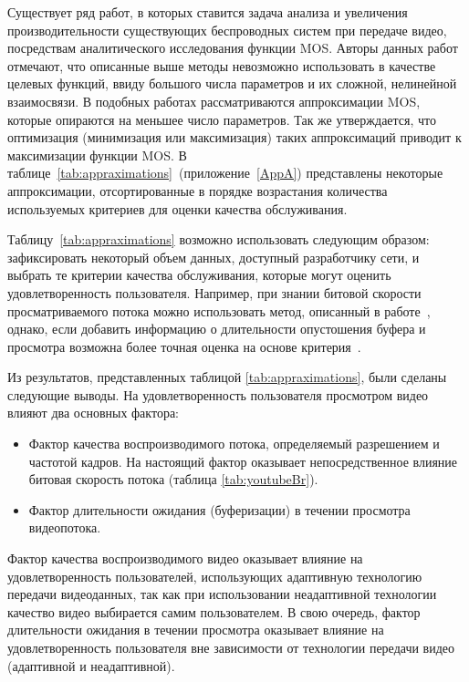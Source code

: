 Существует ряд работ, в которых ставится задача анализа и увеличения производительности существующих беспроводных систем при передаче видео, посредствам аналитического исследования функции MOS. Авторы данных работ отмечают, что описанные выше методы невозможно использовать в качестве целевых функций, ввиду большого числа параметров и их сложной, нелинейной взаимосвязи. В подобных работах рассматриваются аппроксимации MOS, которые опираются на меньшее число параметров. Так же утверждается, что оптимизация (минимизация или максимизация) таких аппроксимаций приводит к максимизации функции MOS. В таблице~\ref{tab:appraximations}~(приложение~\ref{AppA}) представлены некоторые аппроксимации, отсортированные в порядке возрастания количества используемых критериев для оценки качества обслуживания.

Таблицу~\ref{tab:appraximations} возможно использовать следующим образом: зафиксировать некоторый объем данных, доступный разработчику сети, и выбрать те критерии качества обслуживания, которые могут оценить удовлетворенность пользователя. Например, при знании битовой скорости просматриваемого потока можно использовать метод, описанный в работе~\cite{Suai2015}, однако, если добавить информацию о длительности опустошения буфера и просмотра возможна более точная оценка на основе критерия~\cite{Essaili_Rate}.

Из результатов, представленных таблицой \ref{tab:appraximations}, были сделаны следующие выводы. На удовлетворенность пользователя просмотром видео влияют два основных фактора:
\begin{itemize}
	\item Фактор качества воспроизводимого потока, определяемый разрешением и частотой кадров. На настоящий фактор оказывает непосредственное влияние битовая скорость потока (таблица \ref{tab:youtubeBr}).
	\item Фактор длительности ожидания (буферизации) в течении просмотра видеопотока.
\end{itemize}
Фактор качества воспроизводимого видео оказывает влияние на удовлетворенность пользователей, использующих адаптивную технологию передачи видеоданных, так как при использовании неадаптивной технологии качество видео выбирается самим пользователем. В свою очередь, фактор длительности ожидания в течении просмотра оказывает влияние на удовлетворенность пользователя вне зависимости от технологии передачи видео (адаптивной и неадаптивной).

